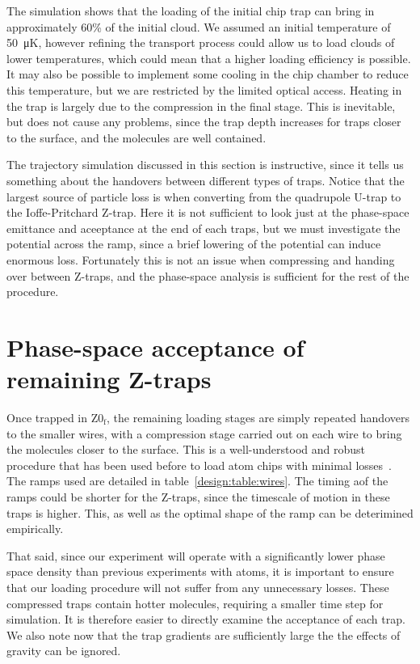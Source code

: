 The simulation shows that the loading of the initial chip trap can bring in
approximately 60\% of the initial cloud. We assumed an initial temperature of
\SI{50}{\micro\kelvin}, however refining the transport process could allow us
to load clouds of lower temperatures, which could mean that a higher loading
efficiency is possible. It may also be possible to implement some cooling in
the chip chamber to reduce this temperature, but we are restricted by the
limited optical access.
%
Heating in the trap is largely due to the compression in the final stage. This
is inevitable, but does not cause any problems, since the trap depth
increases for traps closer to the surface, and the molecules are
well contained.

The trajectory simulation discussed in this section is instructive, since it
tells us something about the handovers between different types of traps. Notice
that the largest source of particle loss is when converting from the quadrupole
U-trap to the Ioffe-Pritchard Z-trap. Here it is not sufficient to look just at
the phase-space emittance and aceeptance at the end of each traps, but we must
investigate the potential across the ramp, since a brief lowering of the
potential can induce enormous loss. Fortunately this is not an issue when
compressing and handing over between Z-traps, and the phase-space analysis is
sufficient for the rest of the procedure.

\section{Phase-space acceptance of remaining Z-traps}
\label{design:transferbetweenzs}

Once trapped in $\mathrm{Z0_f}$, the remaining loading stages are simply
repeated handovers to the smaller wires, with a compression stage carried out
on each wire to bring the molecules closer to the surface. This is a
well-understood and robust procedure that has been used before to load atom
chips with minimal losses~\cite{Reichel2002}. The ramps used are detailed in
table~\ref{design:table:wires}.  The timing aof the ramps could be shorter for
the Z-traps, since the timescale of motion in these traps is higher. This, as
well as the optimal shape of the ramp can be deterimined empirically.

That said, since our experiment will operate with a significantly lower phase
space density than previous experiments with atoms, it is important to ensure
that our loading procedure will not suffer from any unnecessary losses. These
compressed traps contain hotter molecules, requiring a smaller time step for
simulation. It is therefore easier to directly examine the acceptance of each
trap. We also note now that the trap gradients are sufficiently large the the
effects of gravity can be ignored.

